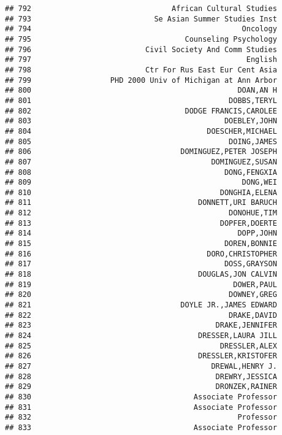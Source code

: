 \documentclass[
]{article}
\begin{document}
\begin{verbatim}
## 792                                African Cultural Studies
## 793                            Se Asian Summer Studies Inst
## 794                                                Oncology
## 795                                   Counseling Psychology
## 796                          Civil Society And Comm Studies
## 797                                                 English
## 798                          Ctr For Rus East Eur Cent Asia
## 799                  PHD 2000 Univ of Michigan at Ann Arbor
## 800                                               DOAN,AN H
## 801                                             DOBBS,TERYL
## 802                                   DODGE FRANCIS,CAROLEE
## 803                                            DOEBLEY,JOHN
## 804                                        DOESCHER,MICHAEL
## 805                                             DOING,JAMES
## 806                                  DOMINGUEZ,PETER JOSEPH
## 807                                         DOMINGUEZ,SUSAN
## 808                                            DONG,FENGXIA
## 809                                                DONG,WEI
## 810                                           DONGHIA,ELENA
## 811                                      DONNETT,URI BARUCH
## 812                                             DONOHUE,TIM
## 813                                           DOPFER,DOERTE
## 814                                               DOPP,JOHN
## 815                                            DOREN,BONNIE
## 816                                        DORO,CHRISTOPHER
## 817                                            DOSS,GRAYSON
## 818                                      DOUGLAS,JON CALVIN
## 819                                              DOWER,PAUL
## 820                                             DOWNEY,GREG
## 821                                  DOYLE JR.,JAMES EDWARD
## 822                                             DRAKE,DAVID
## 823                                          DRAKE,JENNIFER
## 824                                      DRESSER,LAURA JILL
## 825                                           DRESSLER,ALEX
## 826                                      DRESSLER,KRISTOFER
## 827                                         DREWAL,HENRY J.
## 828                                          DREWRY,JESSICA
## 829                                          DRONZEK,RAINER
## 830                                     Associate Professor
## 831                                     Associate Professor
## 832                                               Professor
## 833                                     Associate Professor

\end{verbatim}
\end{document}

